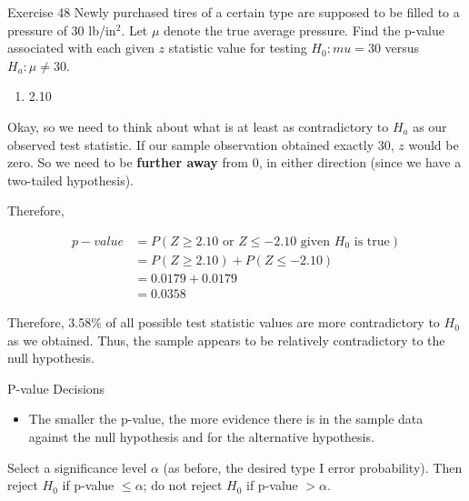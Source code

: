 \documentclass[
  ignorenonframetext,
]{beamer}
\providecommand{\tightlist}{%
  \setlength{\itemsep}{0pt}\setlength{\parskip}{0pt}}\usepackage{longtable,booktabs,array}
\begin{document}
\begin{frame}{Exercise 48}
\protect\hypertarget{exercise-48}{}
Newly purchased tires of a certain type are supposed to be filled to a
pressure of 30 lb/in\(^{2}\). Let \(\mu\) denote the true average
pressure. Find the p-value associated with each given \(z\) statistic
value for testing \(H_{0}: mu = 30\) versus \(H_{a}: \mu \neq 30\).

\begin{enumerate}[<+->]
[a.]
\tightlist
\item
  2.10
\end{enumerate}

Okay, so we need to think about what is at least as contradictory to
\(H_{a}\) as our observed test statistic. If our sample observation
obtained exactly 30, \(z\) would be zero. So we need to be
\textbf{further away} from 0, in either direction (since we have a
two-tailed hypothesis).

Therefore,

\[
\begin{aligned}
p-value &= P(Z \geq 2.10 \text{ or } Z \leq -2.10 \text{ given } H_{0} \text{ is true}) \\
&= P(Z \geq 2.10) + P(Z \leq -2.10) \\
&= 0.0179 + 0.0179 \\
&= 0.0358
\end{aligned}
\]

Therefore, 3.58\% of all possible test statistic values are more
contradictory to \(H_{0}\) as we obtained. Thus, the sample appears to
be relatively contradictory to the null hypothesis.
\end{frame}

\begin{frame}{P-value Decisions}
\protect\hypertarget{p-value-decisions}{}
\begin{itemize}[<+->]
\tightlist
\item
  The smaller the p-value, the more evidence there is in the sample data
  against the null hypothesis and for the alternative hypothesis.
\end{itemize}

\begin{tcolorbox}[enhanced jigsaw, left=2mm, breakable, bottomrule=.15mm, colframe=quarto-callout-important-color-frame, arc=.35mm, leftrule=.75mm, colbacktitle=quarto-callout-important-color!10!white, titlerule=0mm, opacityback=0, coltitle=black, opacitybacktitle=0.6, colback=white, toprule=.15mm, toptitle=1mm, bottomtitle=1mm, title=\textcolor{quarto-callout-important-color}{\faExclamation}\hspace{0.5em}{Decision Rule based on the p-value}, rightrule=.15mm]

Select a significance level \(\alpha\) (as before, the desired type I
error probability). Then reject \(H_{0}\) if p-value \(\leq \alpha\); do
not reject \(H_{0}\) if p-value \(> \alpha\).

\end{tcolorbox}
\end{frame}
\end{document}
